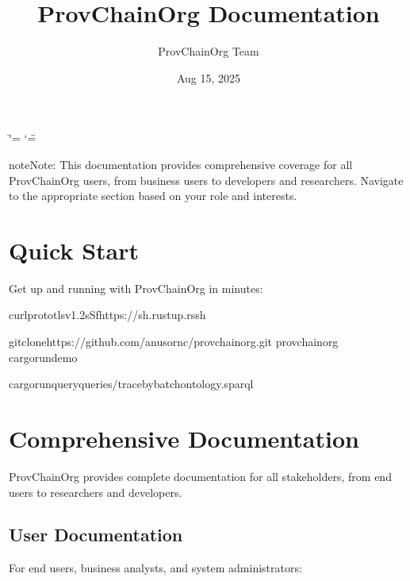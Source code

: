 \documentclass[letterpaper,10pt,english]{sphinxmanual}
\title{ProvChainOrg Documentation}
\date{Aug 15, 2025}
\author{ProvChainOrg Team}
\begin{document}
\ifdefined\shorthandoff
  \ifnum\catcode`\=\string=\active\shorthandoff{=}\fi
  \ifnum\catcode`\"=\active{}\fi
\fi

\pagestyle{empty}
\sphinxmaketitle
\pagestyle{plain}
\sphinxtableofcontents
\pagestyle{normal}
\label{\detokenize{index::doc}}




\begin{sphinxadmonition}{note}{Note:}
\sphinxAtStartPar
This documentation provides comprehensive coverage for all ProvChainOrg users, from business users to developers and researchers. Navigate to the appropriate section based on your role and interests.
\end{sphinxadmonition}


\chapter{Quick Start}
\label{\detokenize{index:quick-start}}
\sphinxAtStartPar
Get up and running with ProvChainOrg in minutes:

\begin{sphinxVerbatim}[commandchars=\\\{\}]
curl\PYGZhy{}\PYGZhy{}proto\PYGZhy{}\PYGZhy{}tlsv1.2\PYGZhy{}sSfhttps://sh.rustup.rssh

gitclonehttps://github.com/anusornc/provchain\PYGZhy{}org.git
provchain\PYGZhy{}org
cargorundemo

cargorun\PYGZhy{}\PYGZhy{}queryqueries/trace\PYGZus{}by\PYGZus{}batch\PYGZus{}ontology.sparql
\end{sphinxVerbatim}




\chapter{Comprehensive Documentation}
\label{\detokenize{index:comprehensive-documentation}}
\sphinxAtStartPar
ProvChainOrg provides complete documentation for all stakeholders, from end users to researchers and developers.


\section{User Documentation}
\label{\detokenize{index:user-documentation}}
\sphinxAtStartPar
For end users, business analysts, and system administrators:
\end{document}
